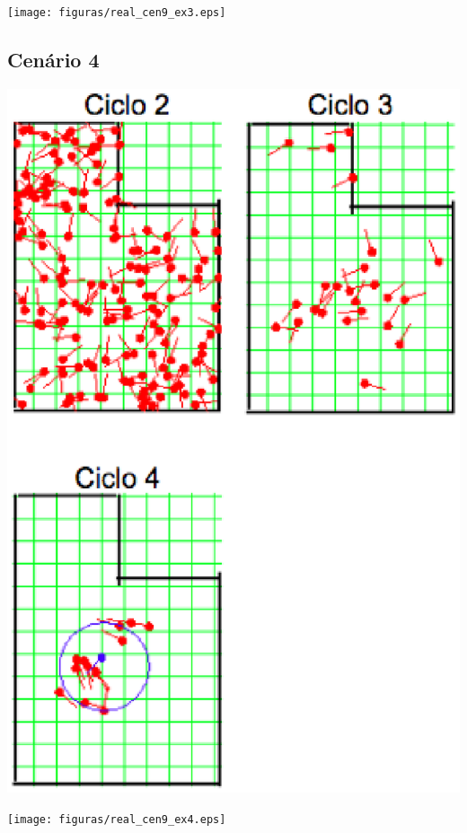 {\centering
\texttt{[image: figuras/real\_cen9\_ex3.eps]}
\label{img:real_cen9_ex3}
\par}

\subsection{Cenário 4}

{\centering
\includegraphics[scale=0.4]{figuras/cen9_ex4.eps}
\label{img:cen9_ex4}
\par}

{\centering
\texttt{[image: figuras/real\_cen9\_ex4.eps]}
\label{img:real_cen9_ex4}
\par}

